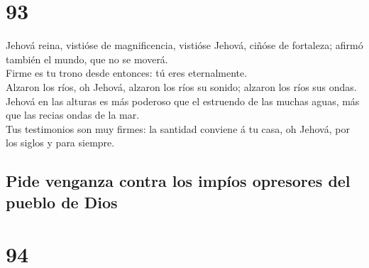 \hypertarget{section-92}{%
\section{93}\label{section-92}}

 Jehová reina, vistióse de magnificencia, vistióse Jehová,
ciñóse de fortaleza; afirmó también el mundo, que no se moverá.\\
 Firme es tu trono desde entonces: tú eres eternalmente.\\
 Alzaron los ríos, oh Jehová, alzaron los ríos su sonido;
alzaron los ríos sus ondas.\\
 Jehová en las alturas es más poderoso que el estruendo de
las muchas aguas, más que las recias ondas de la mar.\\
 Tus testimonios son muy firmes: la santidad conviene á tu
casa, oh Jehová, por los siglos y para siempre.

\hypertarget{pide-venganza-contra-los-impuxedos-opresores-del-pueblo-de-dios}{%
\subsection{Pide venganza contra los impíos opresores del pueblo de
Dios}\label{pide-venganza-contra-los-impuxedos-opresores-del-pueblo-de-dios}}

\hypertarget{section-93}{%
\section{94}\label{section-93}}

